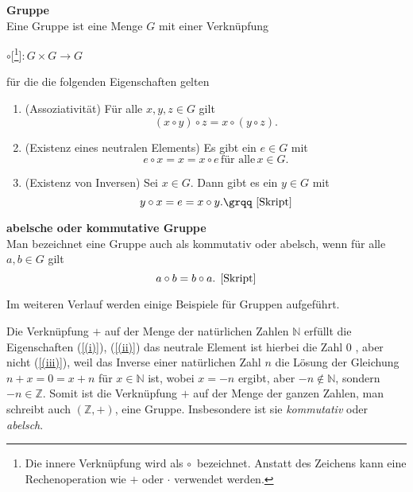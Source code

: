 \theoremstyle {definition}
\begin{definition} {\textbf{Gruppe}
	\\ {\glqq}Eine Gruppe ist eine Menge $G$ mit einer Verknüpfung 
\begin{center}
$\circ$[\footnote{Die innere Verknüpfung wird als \glqq $\circ$\grqq \, bezeichnet. Anstatt des Zeichens kann eine Rechenoperation wie $+$ oder $\cdot$ verwendet werden.}]$ : G \times G \rightarrow G$ 
\end{center}
für die die folgenden Eigenschaften gelten
\begin{enumerate}
	\item (Assoziativität) Für alle $x, y, z \in G$ gilt 	
	\label{(i)}
	\[(x \circ y) \circ z = x \circ (y \circ z)\text{.}\]
	\item (Existenz eines neutralen Elements) Es gibt ein $e \in G$ mit  
	\label{(ii)}	
	\[e \circ x = x = x \circ e \,\text{für alle}\, x \in G \text{.}\]
	\item (Existenz von Inversen) Sei $x \in G$. Dann gibt es ein $y \in G$ mit 
	\label{(iii)}	
	\[y \circ x = e = x \circ y \text{.{\grqq} \cite[S. 19, 4.2]{Skript}}\]
\end{enumerate}
}\end{definition}

\theoremstyle{definition}
\begin{definition}{\textbf{abelsche oder kommutative Gruppe}}
	\\Man bezeichnet eine Gruppe auch als kommutativ oder abelsch, wenn für alle $a,b \in G$ gilt
\[a \circ b = b \circ a\text{. \cite[S. 19, 4.3]{Skript}}\]
\end{definition}

Im weiteren Verlauf werden einige Beispiele für Gruppen aufgeführt.
\theoremstyle{example}
\begin{example}{}
Die Verknüpfung $+$ auf der Menge der natürlichen Zahlen $\mathbb{N}$ erfüllt die Eigenschaften 
(\ref{(i)}), (\ref{(ii)}) {\textendash} das neutrale Element ist hierbei die Zahl $0$ {\textendash} , aber nicht (\ref{(iii)}), weil das Inverse einer natürlichen Zahl $n$ die Lösung der Gleichung $n + x = 0 = x + n $ für $x \in \mathbb{N}$ ist, wobei $ x = -n$ ergibt, aber $-n \not\in \mathbb{N}$, sondern $-n \in \mathbb{Z}$. Somit ist die Verknüpfung $+$ auf der Menge der ganzen Zahlen, man schreibt auch $(\mathbb{Z}, +)$, eine Gruppe. Insbesondere ist sie \emph{kommutativ} oder \emph{abelsch}.
\end{example}

